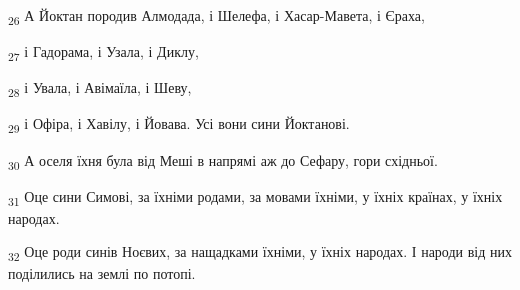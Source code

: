 \begin{tcolorbox}
\textsubscript{26} А Йоктан породив Алмодада, і Шелефа, і Хасар-Мавета, і Єраха,
\end{tcolorbox}
\begin{tcolorbox}
\textsubscript{27} і Гадорама, і Узала, і Диклу,
\end{tcolorbox}
\begin{tcolorbox}
\textsubscript{28} і Увала, і Авімаїла, і Шеву,
\end{tcolorbox}
\begin{tcolorbox}
\textsubscript{29} і Офіра, і Хавілу, і Йовава. Усі вони сини Йоктанові.
\end{tcolorbox}
\begin{tcolorbox}
\textsubscript{30} А оселя їхня була від Меші в напрямі аж до Сефару, гори східньої.
\end{tcolorbox}
\begin{tcolorbox}
\textsubscript{31} Оце сини Симові, за їхніми родами, за мовами їхніми, у їхніх країнах, у їхніх народах.
\end{tcolorbox}
\begin{tcolorbox}
\textsubscript{32} Оце роди синів Ноєвих, за нащадками їхніми, у їхніх народах. І народи від них поділились на землі по потопі.
\end{tcolorbox}
